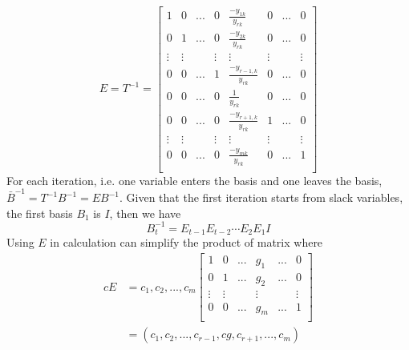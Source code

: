                 \begin{equation}
                    E =  T ^{-1}=\left[ \begin{array}{cccccccc}
                        1 & 0 & ... & 0 & \frac{-y_{1k}}{y_{rk}} & 0 & ... & 0 \\
                        0 & 1 & ... & 0 & \frac{-y_{2k}}{y_{rk}} & 0 & ... & 0 \\
                        \vdots & \vdots & & \vdots & \vdots & \vdots & & \vdots \\
                        0 & 0 & ... & 1 & \frac{-y_{r-1,k}}{y_{rk}} & 0 & ... & 0 \\
                        0 & 0 & ... & 0 & \frac{1}{y_{rk}} & 0 & ... & 0 \\
                        0 & 0 & ... & 0 & \frac{-y_{r+1,k}}{y_{rk}} & 1 & ... & 0 \\
                        \vdots & \vdots & & \vdots & \vdots & \vdots & & \vdots \\
                        0 & 0 & ... & 0 &  \frac{-y_{mk}}{y_{rk}} & 0 & ... & 1 \\
                    \end{array} \right] \nonumber
                \end{equation}
                For each iteration, i.e. one variable enters the basis and one leaves the basis, $\bar{B}^{-1}=T^{-1}B^{-1}=EB^{-1}$. Given that the first iteration starts from slack variables, the first basis $B_1$ is $I$, then we have
                \begin{equation}
                    B^{-1}_t=E_{t-1} E_{t-2} \cdots E_{2} E_{1} I\nonumber
                \end{equation}
                Using $E$ in calculation can simplify the product of matrix where
                \begin{align}
                    cE &= {c_1,c_2,...,c_m} \left[ \begin{array}{cccccc}
                    1 & 0 & ... & g_1 & ... & 0 \\
                    0 & 1 & ... & g_2 & ... & 0 \\
                    \vdots & \vdots & & \vdots & & \vdots \\
                    0 & 0 & ... & g_m & ... & 1 \\
                    \end{array} \right] \nonumber \\
                    &= (c_1, c_2, ... ,c_{r-1}, cg, c_{r+1}, ..., c_m) \nonumber
                \end{align}
